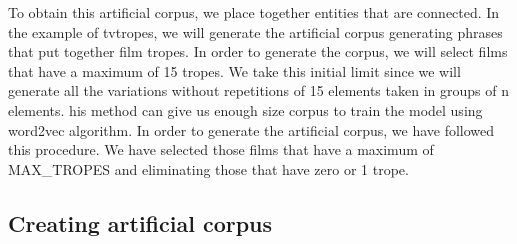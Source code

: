\documentclass[letterpaper]{article}
\begin{document}
	
	
	
	

To obtain this artificial corpus, we place together entities
that are connected. In the example of tvtropes, we will
generate the artificial corpus generating phrases that put
together film tropes. In order to generate the corpus, we will
select films that have a maximum of 15 tropes. We take this
initial limit since we will generate all the variations
without repetitions of 15 elements taken in groups of n
elements. his method can give us enough size corpus to train
the model using word2vec algorithm.
In order to generate the artificial corpus, we have followed this procedure. We have selected those films that have a maximum of MAX\_TROPES and eliminating those that have zero or 1 trope.   

    \subsection{Creating artificial corpus}
		
\end{document}
